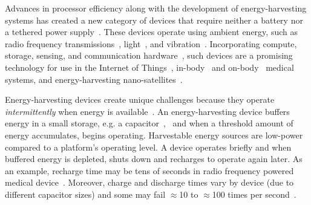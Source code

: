 Advances in processor efficiency along with the development of energy-harvesting systems has created a new category of devices that require neither a battery nor a tethered power supply~\citep{prasad_comst_2014,lucia_snapl_2017,soyata_csm_2016}. These devices operate using ambient energy, such as radio frequency transmissions~\citep{rf_powered_computing_gollakota_2014}, light~\citep{margolies_infocom_2016,margolies_tosn_2016}, and vibration~\citep{gorlatova_sigmetrics_2014}. Incorporating compute, storage, sensing, and communication hardware~\citep{wisp5,moo}, such devices are a promising technology for use in the Internet of Things~\citep{ku_cst_2016}, in-body~\citep{nadeau_naturebio_2017} and on-body~\citep{bandodkar_electroanalysis_2015} medical systems, and energy-harvesting nano-satellites~\citep{kicksat}.

Energy-harvesting devices create unique challenges because they operate {\em intermittently} when energy is available~\citep{hicks_isca_2017,lucia_snapl_2017}. An
energy-harvesting device buffers energy in a small storage, e.g. a capacitor~\citep{gorlatova_tmc_2013},~\citep{gunduz_commag_2014} and when a threshold amount of energy accumulates, begins operating. Harvestable energy sources are low-power compared to a platform's operating level. A device operates briefly and when buffered energy is depleted, shuts down and recharges to operate again later. As an example, recharge time may be tens of seconds in radio frequency powered medical device~\cite[Fig. 3c]{nadeau_naturebio_2017}. Moreover, charge and discharge times vary by device (due to different capacitor sizes) and some may fail $\approx$10 to $\approx$100 times per second~\citep{tan_infocom_2016,mementos,nvp}.


